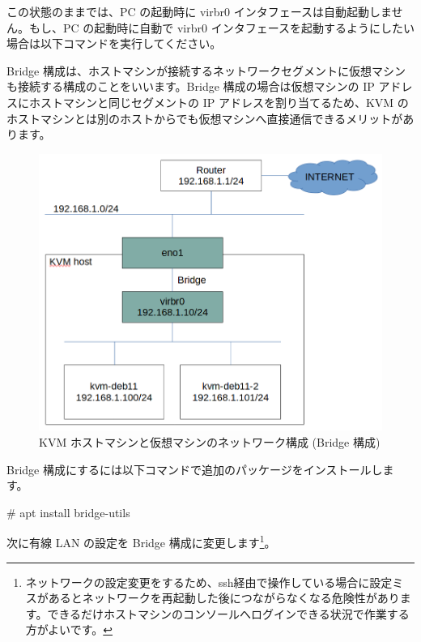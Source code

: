 \documentclass[mingoth,a4paper]{jsarticle}
\begin{document}
この状態のままでは、PC の起動時に virbr0 インタフェースは自動起動しません。もし、PC の起動時に自動で virbr0 インタフェースを起動するようにしたい場合は以下コマンドを実行してください。




Bridge 構成は、ホストマシンが接続するネットワークセグメントに仮想マシンも接続する構成のことをいいます。Bridge 構成の場合は仮想マシンの IP アドレスにホストマシンと同じセグメントの IP アドレスを割り当てるため、KVM のホストマシンとは別のホストからでも仮想マシンへ直接通信できるメリットがあります。

\begin{figure}[h]
  \centering
  \includegraphics[scale=0.3]{image202210/kvm-network_bridge.png}
  \caption{KVM ホストマシンと仮想マシンのネットワーク構成 (Bridge 構成)}
  \label{fig:kvm-network_bridge}
\end{figure}

Bridge 構成にするには以下コマンドで追加のパッケージをインストールします。

\begin{commandline}
# apt install bridge-utils
\end{commandline}

次に有線 LAN の設定を Bridge 構成に変更します\footnote{ネットワークの設定変更をするため、ssh経由で操作している場合に設定ミスがあるとネットワークを再起動した後につながらなくなる危険性があります。できるだけホストマシンのコンソールへログインできる状況で作業する方がよいです。}。
\end{document}
